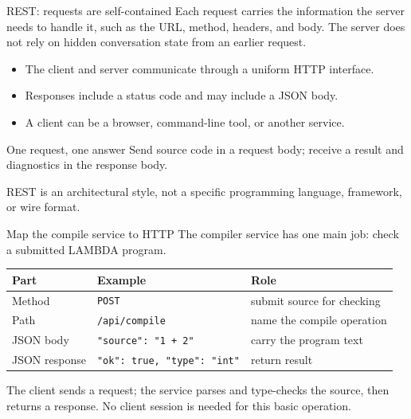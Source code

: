 \documentclass[aspectratio=169,11pt]{beamer}
\begin{document}
\begin{frame}{REST: requests are self-contained}
Each request carries the information the server needs to handle it, such as the URL, method, headers, and body. The server does not rely on hidden conversation state from an earlier request.
\begin{itemize}
  \item The client and server communicate through a uniform HTTP interface.
  \item Responses include a status code and may include a JSON body.
  \item A client can be a browser, command-line tool, or another service.
\end{itemize}
\begin{exampleblock}{One request, one answer}
Send source code in a request body; receive a result and diagnostics in the response body.
\end{exampleblock}
REST is an architectural style, not a specific programming language, framework, or wire format.
\end{frame}

\begin{frame}{Map the compile service to HTTP}
The compiler service has one main job: check a submitted LAMBDA program.
\begin{center}
\begin{tabular}{lll}
\textbf{Part} & \textbf{Example} & \textbf{Role} \\
\hline
Method & \texttt{POST} & submit source for checking \\
Path & \texttt{/api/compile} & name the compile operation \\
JSON body & \texttt{"source": "1 + 2"} & carry the program text \\
JSON response & \texttt{"ok": true, "type": "int"} & return result \\
\end{tabular}
\end{center}
The client sends a request; the service parses and type-checks the source, then returns a response. No client session is needed for this basic operation.
\end{frame}
\end{document}
